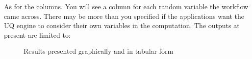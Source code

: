 As for the columns. You will see a column for each random variable the
workflow came across. There may be more than you specified if the
applications want the UQ engine to consider their own variables in the
computation. The outputs at present are limited to:

\begin{figure}[!htbp]
  \caption{Results presented graphically and in tabular form}
  \label{fig:results_data}
\end{figure}
